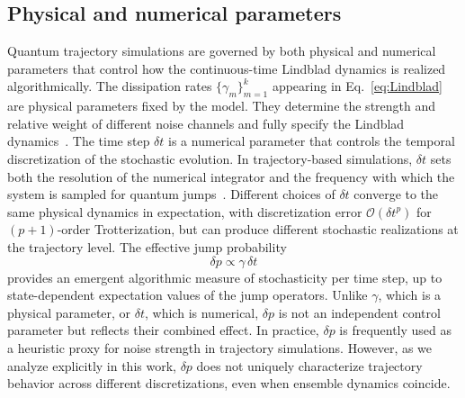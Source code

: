 \documentclass[aps, pra, superscriptaddress, reprint, floatfix]{revtex4-2}
\theoremstyle{plain}
\begin{document}
\subsection{Physical and numerical parameters}
Quantum trajectory simulations are governed by both physical and numerical parameters that control how the continuous-time Lindblad dynamics is realized algorithmically.
The dissipation rates $\{\gamma_m\}_{m=1}^k$ appearing in Eq.~\eqref{eq:Lindblad} are physical parameters fixed by the model. They determine the strength and relative weight of different noise channels and fully specify the Lindblad dynamics~\cite{Lindblad1976, Breuer_2007}.
The time step $\delta t$ is a numerical parameter that controls the temporal discretization of the stochastic evolution. In trajectory-based simulations, $\delta t$ sets both the resolution of the numerical integrator and the frequency with which the system is sampled for quantum jumps~\cite{Wiseman_Milburn_2009, daley_2014}. Different choices of $\delta t$ converge to the same physical dynamics in expectation, with discretization error $\mathcal{O}(\delta t^p)$ for $(p+1)$-order Trotterization, but can produce different stochastic realizations at the trajectory level.
The effective jump probability
\begin{equation}
\delta p \propto \gamma\, \delta t
\end{equation}
provides an emergent algorithmic measure of stochasticity per time step, up to state-dependent expectation values of the jump operators. Unlike $\gamma$, which is a physical parameter, or $\delta t$, which is numerical, $\delta p$ is not an independent control parameter but reflects their combined effect. In practice, $\delta p$ is frequently used as a heuristic proxy for noise strength in trajectory simulations. However, as we analyze explicitly in this work, $\delta p$ does not uniquely characterize trajectory behavior across different discretizations, even when ensemble dynamics coincide.
\end{document}

